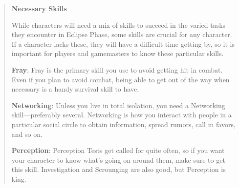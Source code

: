 \begin{quotation}
\textbf{Necessary Skills}

While characters will need a mix of skills to
succeed in the varied tasks they encounter in
Eclipse Phase, some skills are crucial for any
character. If a character lacks these, they will
have a difficult time getting by, so it is important
for players and gamemasters to know
these particular skills.

\textbf{Fray}: Fray is the primary skill you use to avoid
getting hit in combat. Even if you plan to avoid
combat, being able to get out of the way when
necessary is a handy survival skill to have.

\textbf{Networking}: Unless you live in total isolation,
you need a Networking skill—preferably several.
Networking is how you interact with people in
a particular social circle to obtain information,
spread rumors, call in favors, and so on.

\textbf{Perception}: Perception Tests get called for
quite often, so if you want your character to
know what’s going on around them, make sure
to get this skill. Investigation and Scrounging
are also good, but Perception is king.
\end{quotation}


